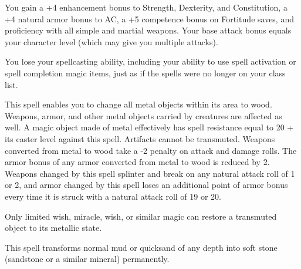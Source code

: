 \begin{multicols}{2}
\begin{small}
\smallskip\noindent You gain a +4 enhancement bonus to Strength, Dexterity, and Constitution, a +4 natural armor bonus to AC, a +5 competence bonus on Fortitude saves, and proficiency with all simple and martial weapons. Your base attack bonus equals your character level (which may give you multiple attacks).

\smallskip\noindent You lose your spellcasting ability, including your ability to use spell activation or spell completion magic items, just as if the spells were no longer on your class list.


\noindent This spell enables you to change all metal objects within its area to wood. Weapons, armor, and other metal objects carried by creatures are affected as well. A magic object made of metal effectively has spell resistance equal to 20 + its caster level against this spell. Artifacts cannot be transmuted. Weapons converted from metal to wood take a -2 penalty on attack and damage rolls. The armor bonus of any armor converted from metal to wood is reduced by 2. Weapons changed by this spell splinter and break on any natural attack roll of 1 or 2, and armor changed by this spell loses an additional point of armor bonus every time it is struck with a natural attack roll of 19 or 20.

\smallskip\noindent Only limited wish, miracle, wish, or similar magic can restore a transmuted object to its metallic state.

\noindent This spell transforms normal mud or quicksand of any depth into soft stone (sandstone or a similar mineral) permanently.


\end{small}
\end{multicols}
